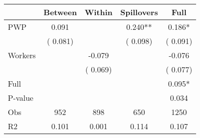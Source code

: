 
\begin{tabular}{l*{4}{c}}\hline&\multicolumn{1}{c}{Between}&\multicolumn{1}{c}{Within}&\multicolumn{1}{c}{Spillovers}&\multicolumn{1}{c}{Full}\\ \hline
 PWP           &              0.091      &                                               &        0.240** &         0.186*                            \\ 
                               &        (       0.081)           &                                       &       (       0.098)     &      (       0.091)                                           \\ 
 Workers       &                                               &       -0.079    &                                &            -0.076                            \\ 
                               &                                               & (       0.069)                  &                                        &      (       0.077)                                           \\ 
\hline                                                                                                                                                                                                                                            
 Full                  &                                               &                                               &                                        &             0.095*                                     \\ 
 P-value               &                                               &                                               &                                        &             0.034                                           \\ 
 Obs                   &               952               &       898                       &       650                &              1250                                               \\ 
 R2                    &                      0.101              &              0.001                      &              0.114               &                     0.107                                              \\ 
\hline \end{tabular}                                                                                                                                                                                                              